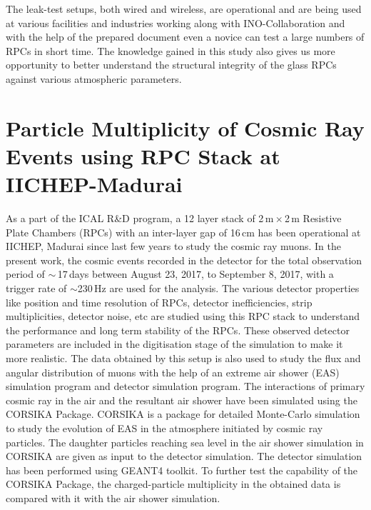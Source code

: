 \documentclass[a4paper,12pt,twoside,openany]{article}
\begin{document}
The leak-test setups, both wired and wireless, are operational and are being used at various facilities and industries working along with INO-Collaboration and with the help of the prepared document even a novice can test a large numbers of RPCs in short time. The knowledge gained in this study also gives us more opportunity to better understand the structural integrity of the glass RPCs against various atmospheric parameters.

\section{Particle Multiplicity of Cosmic Ray Events using RPC Stack at IICHEP-Madurai}

As a part of the ICAL R\&D program, a 12 layer stack of 2\,m\,$\times$\,2\,m Resistive Plate Chambers (RPCs) with an inter-layer gap of 16\,cm has been operational at IICHEP, Madurai since last few years to study the cosmic ray muons. In the present work, the cosmic events recorded in the detector for the total observation period of $\sim$\,17\,days between August 23, 2017, to September 8, 2017, with a trigger rate of $\sim$230\,Hz are used for the analysis. The various detector properties like position and time resolution of RPCs, detector inefficiencies, strip multiplicities, detector noise, etc are studied using this RPC stack to understand the performance and long term stability of the RPCs. These observed detector parameters are included in the digitisation stage of the simulation to make it more realistic.\cite{pethu1} The data obtained by this setup is also used to study the flux and angular distribution of muons with the help of an extreme air shower (EAS) simulation program and detector simulation program. The interactions of primary cosmic ray in the air and the resultant air shower have been simulated using the CORSIKA Package\cite{corsika763}. CORSIKA is a package for detailed Monte-Carlo simulation to study the evolution of EAS in the atmosphere initiated by cosmic ray particles. The daughter particles reaching sea level in the air shower simulation in CORSIKA are given as input to the detector simulation. The detector simulation has been performed using GEANT4 toolkit\cite{geant4}. To further test the capability of the CORSIKA Package, the charged-particle multiplicity in the obtained data is compared with it with the air shower simulation.
\end{document}
